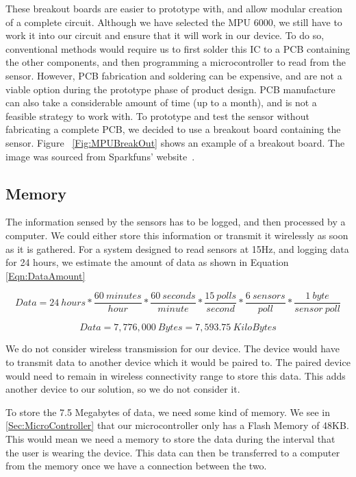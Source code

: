 These breakout boards are easier to prototype with, and allow modular creation of a complete circuit. Although we have selected the MPU 6000, we still have to work it into our circuit and ensure that it will work in our device. To do so, conventional methods would require us to first solder this IC to a PCB containing the other components, and then programming a microcontroller to read from the sensor. However, PCB fabrication and soldering can be expensive, and are not a viable option during the prototype phase of product design. PCB manufacture can also take a considerable amount of time (up to a month), and is not a feasible strategy to work with. To prototype and test the sensor without fabricating a complete PCB, we decided to use a breakout board containing the sensor. Figure ~\ref{Fig:MPUBreakOut} shows an example of a breakout board. The image was sourced from Sparkfuns' website~\cite{Web:SFBreakout}.

\subsection{Memory}
\label{Sec:Memory}

The information sensed by the sensors has to be logged, and then processed by a computer. We could either store this information or transmit it wirelessly as soon as it is gathered. For a system designed to read sensors at 15Hz, and logging data for 24 hours, we estimate the amount of data as shown in Equation \ref{Eqn:DataAmount}

\begin{equation}
\label{Eqn:DataAmount}
Data = 24~hours * \dfrac{60~minutes}{hour} * \dfrac{60~seconds}{minute} * \dfrac{15~polls}{second} * \dfrac{6~sensors}{poll} * \dfrac{1~byte}{sensor~poll}
\end{equation}

\begin{equation}
\label{Eqn:DataAmount2}
Data = 7,776,000~Bytes = 7,593.75~KiloBytes
\end{equation}

We do not consider wireless transmission for our device. The device would have to transmit data to another device which it would be paired to. The paired device would need to remain in wireless connectivity range to store this data. This adds another device to our solution, so we do not consider it. 

To store the 7.5 Megabytes of data, we need some kind of memory. We see in \ref{Sec:MicroController} that our microcontroller only has a Flash Memory of 48KB. This would mean we need a memory to store the data during the interval that the user is wearing the device. This data can then be transferred to a computer from the memory once we have a connection between the two.


